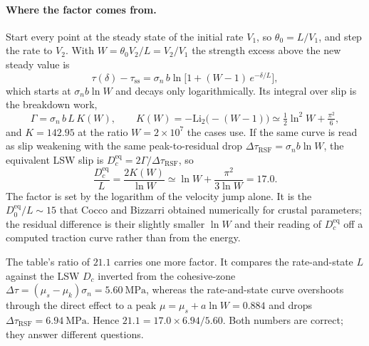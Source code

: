 \documentclass[11pt]{article}
\begin{document}
\paragraph{Where the factor comes from.}
Start every point at the steady state of the initial rate $V_1$, so
$\theta_0 = L/V_1$, and step the rate to $V_2$. With $W = \theta_0 V_2/L = V_2/V_1$
the strength excess above the new steady value is
%
\begin{equation}
  \tau(\delta) - \tau_{\mathrm{ss}}
    = \sigma_n\, b \ln\!\bigl[1 + (W-1)\,e^{-\delta/L}\bigr],
  \label{eq:excess}
\end{equation}
%
which starts at $\sigma_n b\ln W$ and decays only logarithmically. Its integral
over slip is the breakdown work,
%
\begin{equation}
  \Gamma = \sigma_n\, b\, L\, K(W),
  \qquad
  K(W) = -\mathrm{Li}_2\bigl(-(W-1)\bigr)
       \simeq \tfrac12 \ln^{2} W + \tfrac{\pi^{2}}{6},
  \label{eq:gamma-rsf}
\end{equation}
%
and $K = 142.95$ at the ratio $W = 2\times10^{7}$ the cases use. If the same
curve is read as slip weakening with the same peak-to-residual drop
$\Delta\tau_{\mathrm{RSF}} = \sigma_n b \ln W$, the equivalent LSW slip is
$D_c^{\mathrm{eq}} = 2\Gamma/\Delta\tau_{\mathrm{RSF}}$, so
%
\begin{equation}
  \frac{D_c^{\mathrm{eq}}}{L}
    = \frac{2K(W)}{\ln W}
    \simeq \ln W + \frac{\pi^{2}}{3\ln W}
    = 17.0 .
  \label{eq:ratio}
\end{equation}
%
The factor is set by the logarithm of the velocity jump alone. It is the
$D_0^{\mathrm{eq}}/L \sim 15$ that Cocco and Bizzarri obtained numerically for
crustal parameters; the residual difference is their slightly smaller $\ln W$
and their reading of $D_c^{\mathrm{eq}}$ off a computed traction curve rather
than from the energy.

The table's ratio of $21.1$ carries one more factor. It compares the
rate-and-state $L$ against the LSW $D_c$ inverted from the cohesive-zone
$\Delta\tau = (\mu_s - \mu_k)\sigma_n = \SI{5.60}{\mega\pascal}$, whereas the
rate-and-state curve overshoots through the direct effect to a peak
$\mu = \mu_s + a\ln W = 0.884$ and drops
$\Delta\tau_{\mathrm{RSF}} = \SI{6.94}{\mega\pascal}$. Hence
$21.1 = 17.0 \times 6.94/5.60$. Both numbers are correct; they answer different
questions.
\end{document}
